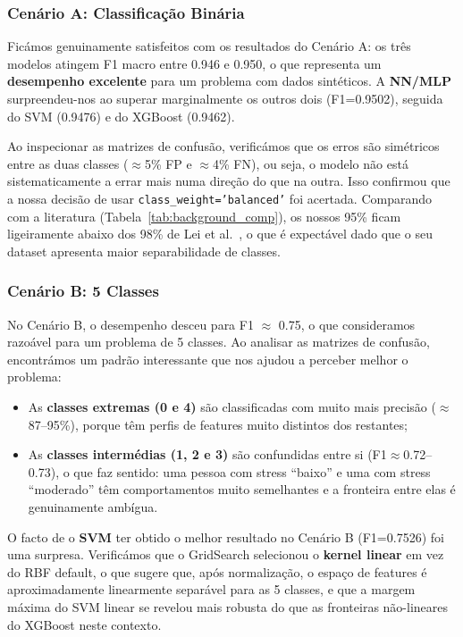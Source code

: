 \documentclass[12pt,a4paper]{article}
\begin{document}
\subsubsection{Cenário A: Classificação Binária}

Ficámos genuinamente satisfeitos com os resultados do Cenário A: os três modelos atingem
F1 macro entre 0.946 e 0.950, o que representa um \textbf{desempenho excelente} para um
problema com dados sintéticos. A \textbf{NN/MLP} surpreendeu-nos ao superar marginalmente
os outros dois (F1=0.9502), seguida do SVM (0.9476) e do XGBoost (0.9462).

Ao inspecionar as matrizes de confusão, verificámos que os erros são simétricos entre
as duas classes ($\approx$5\% FP e $\approx$4\% FN), ou seja, o modelo não está
sistematicamente a errar mais numa direção do que na outra. Isso confirmou que a nossa
decisão de usar \texttt{class\_weight='balanced'} foi acertada. Comparando com a literatura
(Tabela~\ref{tab:background_comp}), os nossos 95\% ficam ligeiramente abaixo dos 98\%
de Lei et al.\ \cite{lei2024}, o que é expectável dado que o seu dataset apresenta
maior separabilidade de classes.

\subsubsection{Cenário B: 5 Classes}

No Cenário B, o desempenho desceu para F1 $\approx$ 0.75, o que consideramos
razoável para um problema de 5 classes. Ao analisar as matrizes de confusão, encontrámos
um padrão interessante que nos ajudou a perceber melhor o problema:
\begin{itemize}
  \item As \textbf{classes extremas (0 e 4)} são classificadas com muito mais precisão
    ($\approx$87--95\%), porque têm perfis de features muito distintos dos restantes;
  \item As \textbf{classes intermédias (1, 2 e 3)} são confundidas entre si
    (F1$\approx$0.72--0.73), o que faz sentido: uma pessoa com stress ``baixo'' e uma
    com stress ``moderado'' têm comportamentos muito semelhantes e a fronteira entre elas
    é genuinamente ambígua.
\end{itemize}

O facto de o \textbf{SVM} ter obtido o melhor resultado no Cenário B (F1=0.7526) foi uma
surpresa. Verificámos que o GridSearch selecionou o \textbf{kernel linear} em vez do
RBF default, o que sugere que, após normalização, o espaço de features é aproximadamente
linearmente separável para as 5 classes, e que a margem máxima do SVM linear se revelou
mais robusta do que as fronteiras não-lineares do XGBoost neste contexto.
\end{document}
